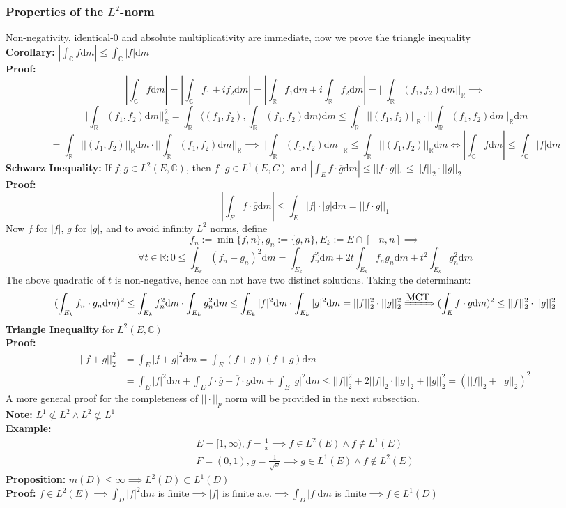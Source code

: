 \documentclass{article}
\newcommand{\C}{\mathbb{C}}
\newcommand{\R}{\mathbb{R}}
\newcommand{\0}{{\bf{0}}}
\newcommand{\1}{{\bf{1}}}
\newcommand{\dint}{\displaystyle\int}
\newcommand{\dif}{\mbox{d}}
\begin{document}
\subsubsection{Properties of the $L^2$-norm}
Non-negativity, identical-0 and absolute multiplicativity are immediate, now we prove the triangle inequality\\
\textbf{Corollary:} $|\dint_\C f\dif m|\le\dint_\C|f|\dif m$\\
\textbf{Proof:}
$$|\int_\C f\dif m|=|\int_\C f_1+if_2\dif m|=|\int_\R f_1\dif m+i\int_\R f_2\dif m|=||\int_\R(f_1,f_2)\dif m||_\R\implies$$
$$||\int_\R(f_1,f_2)\dif m||_\R^2=\int_\R\langle(f_1,f_2),\int_\R(f_1,f_2)\dif m\rangle\dif m\le\int_\R||(f_1,f_2)||_\R\cdot||\int_\R(f_1,f_2)\dif m||_\R\dif m$$
$$=\int_\R||(f_1,f_2)||_\R\dif m\cdot||\int_\R(f_1,f_2)\dif m||_\R\implies||\int_\R(f_1,f_2)\dif m||_\R\le\int_\R||(f_1,f_2)||_\R\dif m\iff|\int_\C f\dif m|\le\int_\C|f|\dif m$$
\textbf{Schwarz Inequality:} If $f,g\in L^2(E,\C)$, then $f\cdot g\in L^1(E,C)$ and $|\dint_Ef\cdot\overline{g}\dif m|\le||f\cdot g||_1\le||f||_2\cdot||g||_2$\\
\textbf{Proof:}
$$|\int_Ef\cdot\overline{g}\dif m|\le\int_E|f|\cdot|g|\dif m=||f\cdot g||_1$$
Now $f$ for $|f|$, $g$ for $|g|$, and to avoid infinity $L^2$ norms, define
$$f_n:=\min\{f,n\},g_n:=\{g,n\},E_k:=E\cap[-n,n]\implies$$
$$\forall t\in\R:0\le\int_{E_k}(f_n+g_n)^2\dif m=\int_{E_k}f_n^2\dif m+2t\int_{E_k}f_ng_n\dif m+t^2\int_{E_k}g_n^2\dif m$$
The above quadratic of $t$ is non-negative, hence can not have two distinct solutions. Taking the determinant:
$$(\int_{E_k}f_n\cdot g_n\dif m)^2\le\int_{E_k}f_n^2\dif m\cdot\int_{E_k}g_n^2\dif m\le\int_{E_k}|f|^2\dif m\cdot\int_{E_k}|g|^2\dif m=||f||_2^2\cdot||g||_2^2\xRightarrow{\mbox{MCT}}(\int_Ef\cdot g\dif m)^2\le||f||_2^2\cdot||g||_2^2$$
\textbf{Triangle Inequality} for $L^2(E,\C)$\\
\textbf{Proof:}
\begin{equation}
\begin{split}
    ||f+g||_2^2&=\int_E|f+g|^2\dif m=\int_E(f+g)\overline{(f+g)}\dif m\\
    &=\int_E|f|^2\dif m+\int_Ef\cdot\overline{g}+\overline{f}\cdot g\dif m+\int_E|g|^2\dif m\le||f||_2^2+2||f||_2\cdot||g||_2+||g||_2^2=(||f||_2+||g||_2)^2
\end{split}
\end{equation}
A more general proof for the completeness of $||\cdot||_p$ norm will be provided in the next subsection.\\
\textbf{Note:} $L^1\not\subset L^2\land L^2\not\subset L^1$\\
\textbf{Example:}
\begin{equation}
\begin{split}
    E=[1,\infty),f=\frac{1}{x}\implies f\in L^2(E)\land f\notin L^1(E)\\
    F=(0,1),g=\frac{1}{\sqrt{x}}\implies g\in L^1(E)\land f\notin L^2(E)
\end{split}
\end{equation}
\textbf{Proposition:} $m(D)\le\infty\implies L^2(D)\subset L^1(D)$\\
\textbf{Proof:} $f\in L^2(E)\implies\dint_D|f|^2\dif m$ is finite$\implies|f|$ is finite a.e.$\implies\dint_D|f|\dif m$ is finite$\implies f\in L^1(D)$
\end{document}
